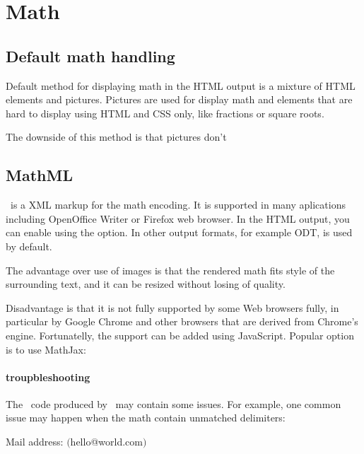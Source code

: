 \section{Math}
\subsection{Default math handling}

Default method for displaying math in the HTML output is a mixture of HTML elements and pictures. Pictures
are used for display math and elements that are hard to display using HTML and CSS only, like fractions or square roots.

The downside of this method is that pictures don't 


\subsection{MathML}

\mathml\ is a XML markup for the math encoding. 
It is supported in many aplications including OpenOffice Writer or Firefox web browser. 
In the HTML output, you can enable \mathml{} using the  option. In other output formats,
for example ODT, \mathml{} is used by default.

The advantage over use of images is that the rendered math fits style of the surrounding text,
and it can be resized without losing of quality.

Disadvantage is that it is not fully supported by some Web browsers fully, in particular
by Google Chrome and other browsers that are derived from Chrome's engine. Fortunatelly,
the support can be added using JavaScript. Popular option is to use MathJax:


\paragraph{\mathml{} troupbleshooting}

The \mathml\ code produced by \texfourht\ may contain some issues. For example,
one common issue may happen when the math contain unmatched delimiters:

\begin{texsource}
 Mail address: $\lparen$hello@world.com$\rparen$
\end{texsource}

